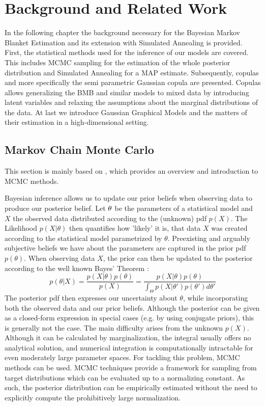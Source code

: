 \chapter{Background and Related Work}
In the following chapter the background necessary for the Bayesian Markov Blanket Estimation and its extension with Simulated Annealing is provided.
First, the statistical methods used for the inference of our models are covered.
This includes \gls{MCMC} sampling for the estimation of the whole posterior distribution and Simulated Annealing for a \gls{MAP} estimate.
Subsequently, copulas and more specifically the semi parametric Gaussian copula are presented.
Copulas allows generalizing the \gls{BMB} and similar models to mixed data by introducing latent variables and relaxing the assumptions about the marginal distributions of the data.
At last we introduce Gaussian Graphical Models and the matters of their estimation in a high-dimensional setting.


\section{Markov Chain Monte Carlo}
This section is mainly based on \citet{andrieu2003introduction}, which provides an overview and introduction to \gls{MCMC} methods.

Bayesian inference allows us to update our prior beliefs when observing data to produce our posterior belief.
Let $\mathbf{\theta}$ be the parameters of a statistical model and $X$ the observed data distributed according to the (unknown) \gls{pdf} $p(X)$.
The Likelihood $p(X|\theta)$ then quantifies how 'likely' it is, that data $X$ was created according to the statistical model parametrized by $\theta$.
Preexisting and arguably subjective beliefs we have about the parameters are captured in the prior \gls{pdf} $p(\theta)$. 
When observing data $X$, the prior can then be updated to the posterior according to the well known Bayes' Theorem \cite[Chapter 1.2.3]{Bishop:2006:PRM:1162264}:
$$
p(\theta|X) = \frac{p(X|\theta) p(\theta)}{p(X)} =  \frac{p(X|\theta) p(\theta)}{\int_\Theta p(X|\theta')p(\theta') d\theta'}
$$
The posterior \gls{pdf} then expresses our uncertainty about $\theta$, while incorporating both the observed data and our prior beliefs.
Although the posterior can be given as a closed-form expression in special cases (e.g. by using conjugate priors), this is generally not the case.
The main difficulty arises from the unknown $p(X)$.
Although it can be calculated by marginalization, the integral usually offers no analytical solution, and numerical integration is computationally intractable for even moderately large parameter spaces.
For tackling this problem, \gls{MCMC} methods can be used.
MCMC techniques provide a framework for sampling from target distributions which can be evaluated up to a normalizing constant.
As such, the posterior distribution can be empirically estimated without the need to explicitly compute the prohibitively large normalization.

